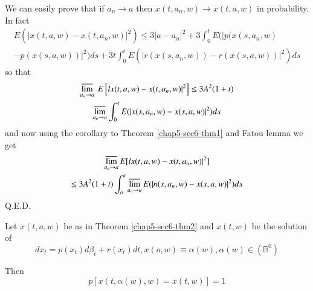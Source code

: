 \begin{remark*}
 We can easily prove that if $a_n \rightarrow a $ then $x(t, a_n, w)
 \rightarrow x(t, a, w)$ in probability. In fact  
\begin{multline*}
E(|x(t, a, w) - x (t, a_n, w) |^2) \leq 3| a-a_n |^2 + 3 \int^t_0
E(|p(x(s, a_n, w)\\ 
- p(x(s, a, w))|^2)ds + 3t \int^t_0 E(|r(x(s, a_n,
w)) - r(x(s, a, w))|^2)ds 
\end{multline*}
so that
\begin{multline*}
\varlimsup_{a_n \rightarrow a} ~ E \left[l x(t, a, w) -x (t,
 a_n, w)|^2\right] \leq 3A^2 (1 + t)\\ 
\varlimsup_{a_n
\rightarrow a} \int^t_0 E (|x (s, a_n, w) - x(s, a, w)|^2)ds 
\end{multline*}
and now using the corollary to Theorem \ref{chap5-sec6-thm1} and Fatou
lemma we get  
\begin{multline*}
\varlimsup_{a_n \rightarrow a} E[l x(t, a, w) - x (t,
 a_n, w)|^2]\\ 
\leq 3A^2 (1+t)  \int^t_o \varlimsup_{a_n
\rightarrow a} E (|n (s, a_n, w) - x(s, a, w)|^2)ds 
\end{multline*}
Q.E.D.
\end{remark*}

\begin{thm}\label{chap5-sec6-thm3}%
  Let $x(t, a, w)$ be as in Theorem \ref{chap5-sec6-thm2} and $x(t,
  w)$ be the solution of  
  $$
  dx_t = p(x_t) d \beta_t + r(x_t) dt, x(o, w) \equiv \alpha (w),
  \alpha (w) \in (\mathbb{B}^0) 
  $$

Then\pageoriginale
$$
p[x(t, \alpha (w), w) = x(t, w)] = 1
$$
\end{thm}

